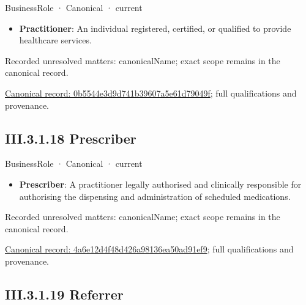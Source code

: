 \label{element:0b5544e3d9d741b39607a5e61d79049f}
{\small BusinessRole · Canonical · current}\par

\begin{itemize}


\item \textbf{Practitioner}: An individual registered, certified, or qualified to provide healthcare services.

\end{itemize}

{\small Recorded unresolved matters: canonicalName; exact scope remains in the canonical record.}\par
{\footnotesize \href{../../../../continuum/business/business-role/0b5544e3d9d741b39607a5e61d79049f.md}{Canonical record: 0b5544e3d9d741b39607a5e61d79049f}; full qualifications and provenance.}\par
\subsection*{III.3.1.18 Prescriber}
\label{navigation:III.3.1.18}

\label{element:4a6e12d4f48d426a98136ea50ad91ef9}
{\small BusinessRole · Canonical · current}\par

\begin{itemize}


\item \textbf{Prescriber}: A practitioner legally authorised and clinically responsible for authorising the dispensing and administration of scheduled medications.

\end{itemize}

{\small Recorded unresolved matters: canonicalName; exact scope remains in the canonical record.}\par
{\footnotesize \href{../../../../continuum/business/business-role/4a6e12d4f48d426a98136ea50ad91ef9.md}{Canonical record: 4a6e12d4f48d426a98136ea50ad91ef9}; full qualifications and provenance.}\par
\subsection*{III.3.1.19 Referrer}
\label{navigation:III.3.1.19}

